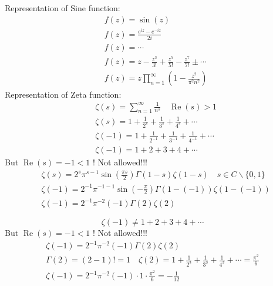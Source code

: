 	Representation of Sine function:
	$$
	\begin{aligned}
		& f(z)=\sin (z) \\
		& f(z)=\frac{e^{i z}-e^{-i z}}{2 i} \\
		& f(z)=\cdots \\
		& f(z)=z-\frac{z^3}{3 !}+\frac{z^5}{5 !}-\frac{z^7}{7 !} \pm \cdots \\
		& f(z)=z \prod_{n=1}^{\infty}\left(1-\frac{z^2}{\pi^2 n^2}\right)
	\end{aligned}
	$$
	Representation of Zeta function:
	$$
	\begin{aligned}
		& \zeta(s)=\sum_{n=1}^{\infty} \frac{1}{n^s} \quad \operatorname{Re}(s)>1 \\
		& \zeta(s)=1+\frac{1}{2^s}+\frac{1}{3^s}+\frac{1}{4^s}+\cdots \\
		& \zeta(-1)=1+\frac{1}{2^{-1}}+\frac{1}{3^{-1}}+\frac{1}{4^{-1}}+\cdots \\
		& \zeta(-1)=1+2+3+4+\cdots
	\end{aligned}
	$$
	But $\operatorname{Re}(s)=-1<1$ ! Not allowed!!!
	$$
	\begin{aligned}
		& \zeta(s)=2^s \pi^{s-1} \sin \left(\frac{\pi s}{2}\right) \Gamma(1-s) \zeta(1-s) \quad s \in C \backslash\{0,1\} \\
		& \zeta(-1)=2^{-1} \pi^{-1-1} \sin \left(-\frac{\pi}{2}\right) \Gamma(1-(-1)) \zeta(1-(-1)) \\
		& \zeta(-1)=2^{-1} \pi^{-2}(-1) \Gamma(2) \zeta(2)
	\end{aligned}
	$$ 
	
	$$
	\zeta(-1) \neq 1+2+3+4+\cdots
	$$
	But $\operatorname{Re}(s)=-1<1$ ! Not allowed!!!
	$$
	\begin{gathered}
		\zeta(-1)=2^{-1} \pi^{-2}(-1) \Gamma(2) \zeta(2) \\
		\Gamma(2)=(2-1) !=1 \quad \zeta(2)=1+\frac{1}{2^2}+\frac{1}{3^2}+\frac{1}{4^2}+\cdots=\frac{\pi^2}{6} \\
		\zeta(-1)=2^{-1} \pi^{-2}(-1) \cdot 1 \cdot \frac{\pi^2}{6}=-\frac{1}{12}
	\end{gathered}
	$$
	
	
	

